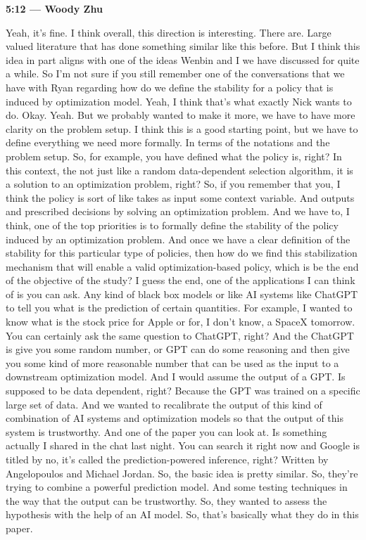 \documentclass[11pt]{article}
\newcommand{\Turn}[2]{%
  \medskip\noindent\textbf{#1 --- #2}\par\nobreak\noindent\ignorespaces
}
\begin{document}
\Turn{5:12}{Woody Zhu}
Yeah, it's fine. I think overall, this direction is interesting. There are.
Large valued literature that has done something similar like this before. But I
think this idea in part aligns with one of the ideas Wenbin and I we have
discussed for quite a while. So I'm not sure if you still remember one of the
conversations that we have with Ryan regarding how do we define the stability
for a policy that is induced by optimization model. Yeah, I think that's what
exactly Nick wants to do. Okay. Yeah. But we probably wanted to make it more,
we have to have more clarity on the problem setup. I think this is a good
starting point, but we have to define everything we need more formally. In
terms of the notations and the problem setup. So, for example, you have defined
what the policy is, right? In this context, the not just like a random
data-dependent selection algorithm, it is a solution to an optimization
problem, right? So, if you remember that you, I think the policy is sort of
like takes as input some context variable. And outputs and prescribed decisions
by solving an optimization problem. And we have to, I think, one of the top
priorities is to formally define the stability of the policy induced by an
optimization problem. And once we have a clear definition of the stability for
this particular type of policies, then how do we find this stabilization
mechanism that will enable a valid optimization-based policy, which is be the
end of the objective of the study? I guess the end, one of the applications I
can think of is you can ask. Any kind of black box models or like AI systems
like ChatGPT to tell you what is the prediction of certain quantities. For
example, I wanted to know what is the stock price for Apple or for, I don't
know, a SpaceX tomorrow. You can certainly ask the same question to ChatGPT,
right? And the ChatGPT is give you some random number, or GPT can do some
reasoning and then give you some kind of more reasonable number that can be
used as the input to a downstream optimization model. And I would assume the
output of a GPT. Is supposed to be data dependent, right? Because the GPT was
trained on a specific large set of data. And we wanted to recalibrate the
output of this kind of combination of AI systems and optimization models so
that the output of this system is trustworthy. And one of the paper you can
look at. Is something actually I shared in the chat last night. You can search
it right now and Google is titled by no, it's called the prediction-powered
inference, right? Written by Angelopoulos and Michael Jordan. So, the basic
idea is pretty similar. So, they're trying to combine a powerful prediction
model. And some testing techniques in the way that the output can be
trustworthy. So, they wanted to assess the hypothesis with the help of an AI
model. So, that's basically what they do in this paper.
\end{document}
